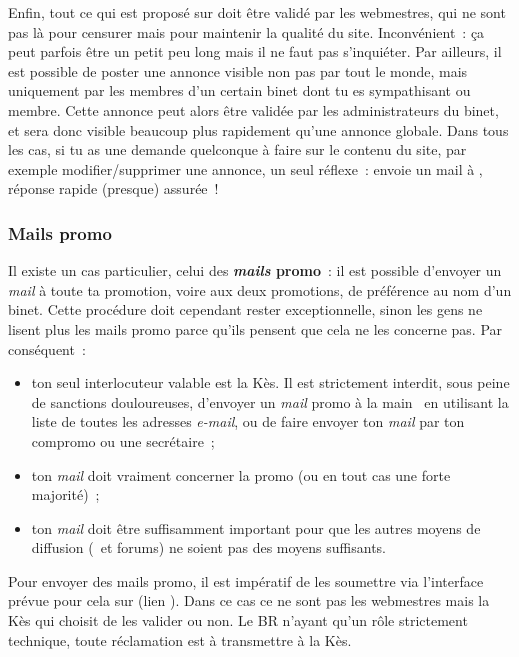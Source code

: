 Enfin, tout ce qui est proposé sur \fkz doit être validé par les
webmestres, qui ne sont pas là  pour censurer mais pour maintenir la
qualité du site. Inconvénient~: \c ca peut parfois être un petit peu
long mais il ne faut pas s'inquiéter.
Par ailleurs, il est possible de poster une annonce visible non pas par tout le monde,
mais uniquement par les membres d'un certain binet dont tu es sympathisant ou membre.
Cette annonce peut alors être validée par les administrateurs du binet, et sera donc visible
beaucoup plus rapidement qu'une annonce globale.
Dans tous les cas, si tu as une demande quelconque à  faire sur le contenu du site, par exemple
modifier/supprimer une annonce, un seul réflexe~: envoie un mail à
, réponse rapide (presque) assurée~!

\subsubsection{Mails promo}
\label{mails}
Il existe un cas particulier, celui des \textbf{\emph{mails} promo}~: il est possible d'envoyer un \emph{mail} à toute
ta promotion, voire aux deux promotions, de préférence au nom d'un binet.
Cette procédure doit cependant rester exceptionnelle, sinon les gens ne lisent plus les
mails promo parce qu'ils pensent que cela ne les concerne pas. Par
conséquent~:
\begin{itemize}
  \item ton seul interlocuteur valable est la Kès. Il est strictement interdit, sous peine de sanctions douloureuses, d'envoyer un \emph{mail} promo \og à la main \fg~en utilisant la liste de toutes les adresses \emph{e-mail},
  ou de faire envoyer ton \emph{mail} par ton compromo ou une secrétaire~;
  \item ton \emph{mail} doit vraiment concerner la promo (ou en tout cas une forte majorité)~;
  \item ton \emph{mail} doit être suffisamment important pour que les autres moyens de diffusion (\fkz\ et forums) ne soient pas des moyens suffisants.
\end{itemize}

Pour envoyer des mails promo, il est impératif de les soumettre via l'interface prévue pour cela sur \fkz (lien ). Dans ce cas ce ne sont pas les webmestres mais la Kès qui choisit de les valider ou non. Le BR n'ayant qu'un rôle strictement technique, toute réclamation est à transmettre à la Kès.


